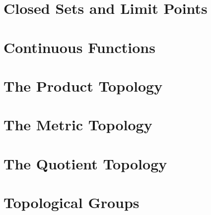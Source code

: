 \documentclass{article}
\begin{document}
\section{Closed Sets and Limit Points}
\newpage

\section{Continuous Functions}
\newpage

\section{The Product Topology}
\newpage

\section{The Metric Topology}
\newpage

\section{The Quotient Topology}
\newpage

\section{Topological Groups} 
\end{document}
